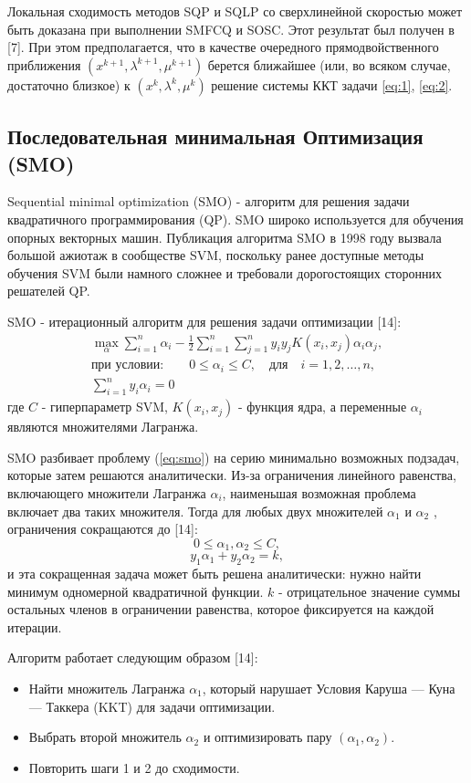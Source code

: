 \documentclass[12pt,a4paper]{article}
\begin{document}
Локальная сходимость методов SQP и SQLP со сверхлинейной скоростью может быть доказана при выполнении SMFCQ и SOSC. Этот результат был получен в [7]. При этом предполагается, что в качестве очередного прямодвойственного приближения $(x^{k+1},\lambda^{k+1}, \mu^{k+1})$ берется ближайшее (или, во всяком случае, достаточно
близкое) к $(x^{k},\lambda^{k}, \mu^{k})$ решение системы ККТ задачи \ref{eq:1}, \ref{eq:2}.	

\subsection{Последовательная минимальная Оптимизация (SMO)}
Sequential minimal optimization (SMO) - алгоритм для решения задачи квадратичного программирования (QP).  SMO широко используется для обучения опорных векторных машин. Публикация алгоритма SMO в 1998 году вызвала большой ажиотаж в сообществе SVM, поскольку ранее доступные методы обучения SVM были намного сложнее и требовали дорогостоящих сторонних решателей QP.
	
SMO - итерационный алгоритм для решения задачи оптимизации [14]:
	\begin{align*}
		\max_{\alpha}\sum_{i=1}^{n}\alpha_{i}-{\frac{1}{2}}\sum_{i=1}^{n}\sum_{j=1}^{n}y_{i}y_{j}K(x_{i},x_{j})\alpha_{i}\alpha_{j},\\	
		 \mbox{при условии:} \qquad
		0\leq \alpha_{i}\leq C, \quad \mbox{для}\quad i=1,2,\ldots ,n,	\\
		\sum_{i=1}^{n}y_{i}\alpha_{i}=0
	\end{align*}\label{eq:smo}
где $C$ - гиперпараметр SVM, $K(x_i, x_j)$ - функция ядра, а переменные $\alpha_{i}$ являются множителями Лагранжа.
	
SMO разбивает проблему (\ref{eq:smo}) на серию минимально возможных подзадач, которые затем решаются аналитически. Из-за ограничения линейного равенства, включающего множители Лагранжа $\alpha_{i}$, наименьшая возможная проблема включает два таких множителя. Тогда для любых двух множителей $\alpha_{1}$ и $\alpha_{2}$ , ограничения сокращаются до [14]:
$$0 \leq \alpha_{1}, \alpha_{2} \leq C,$$
$$ y_{1}\alpha_{1} + y_{2}\alpha_{2} = k,$$ 
и эта сокращенная задача может быть решена аналитически: нужно найти минимум одномерной квадратичной функции. $k$ - отрицательное значение суммы остальных членов в ограничении равенства, которое фиксируется на каждой итерации.
	
Алгоритм работает следующим образом [14]:
	\begin{itemize}
		\item Найти множитель Лагранжа $\alpha_{1}$, который нарушает Условия Каруша — Куна — Таккера (KKT) для задачи оптимизации.
		\item Выбрать второй множитель $\alpha_{2}$ и оптимизировать пару $(\alpha_{1}, \alpha_{2})$.
		\item Повторить шаги 1 и 2 до сходимости.
	\end{itemize}	
	
\end{document}
